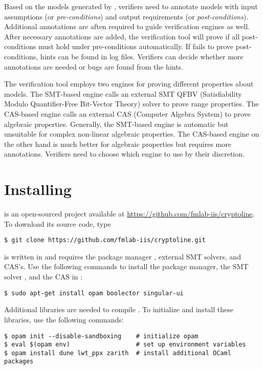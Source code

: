\documentclass{amsproc}
\begin{document}
Based on the \cryptoline models generated by \tozdsl, verifiers need to
annotate models with input assumptions (or \emph{pre-conditions}) and
output requirements (or \emph{post-conditions}). Additional
annotations are aften required to guide \cryptoline verification
engines as well. After necessary annotations are added, the \cryptoline
verification tool will prove if all post-conditions must hold under
pre-conditions automatically. If \cryptoline fails to prove
post-conditions, hints can be found in \cryptoline log files.
Verifiers can decide whether more annotations are needed or bugs are
found from the hints.

The \cryptoline verification tool employs two engines for proving
different properties about \cryptoline models. The SMT-based engine
calls an external SMT QFBV (Satisfiability Modulo Quantifier-Free
Bit-Vector Theory) solver to prove range properties. The CAS-based
engine calls an external CAS (Computer Algebra System) to prove
algebraic properties. Generally, the SMT-based engine is automatic but
unsuitable for complex non-linear algebraic properties. The CAS-based
engine on the other hand is much better for algebraic properties but
requires more annotations. Verifiers need to choose which engine to
use by their discretion. 

\section{Installing \cryptoline}

\cryptoline is an open-sourced project available at
\url{https://github.com/fmlab-iis/cryptoline}. To download its source
code, type
\begin{verbatim}
$ git clone https://github.com/fmlab-iis/cryptoline.git
\end{verbatim}

\cryptoline is written in \ocaml and requires the \ocaml package
manager \opam, external SMT solvers, and CAS's. Use the following
commands to install the \opam package manager, the SMT solver
\boolector, and the CAS \singular in \ubuntu:
\begin{verbatim}
$ sudo apt-get install opam boolector singular-ui 
\end{verbatim}

Additional \ocaml libraries are needed to compile \cryptoline. To
initialize \opam and install these libraries, use the following
commands:
\begin{verbatim}
$ opam init --disable-sandboxing    # initialize opam
$ eval $(opam env)                  # set up environment variables
$ opam install dune lwt_ppx zarith  # install additional OCaml packages
\end{verbatim}
\end{document}
